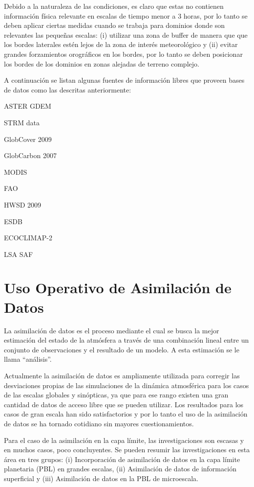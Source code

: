Debido a la naturaleza de las condiciones, es claro que estas no contienen información física relevante en escalas de tiempo menor a 3 horas, por lo tanto se deben aplicar ciertas medidas cuando se trabaja para dominios donde son relevantes las pequeñas escalas: (i) utilizar una zona de buffer de manera que que los bordes laterales estén lejos de la zona de interés meteorológico y (ii) evitar grandes forzamientos orográficos en los bordes, por lo tanto se deben posicionar los bordes de los dominios en zonas alejadas de terreno complejo. 

A continuación  se listan algunas fuentes de información libres que proveen bases de datos como las descritas anteriormente:
\begin{itemize*}
	\item ASTER GDEM
	\item STRM data
	\item GlobCover 2009
	\item GlobCarbon 2007
	\item MODIS
	\item FAO
	\item HWSD 2009
	\item ESDB
	\item ECOCLIMAP-2
	\item LSA SAF
\end{itemize*}
\newpage
\section{Uso Operativo de Asimilación de Datos}
La asimilación de datos es el proceso mediante el cual se busca la mejor  estimación del estado de la atmósfera a través de una combinación lineal entre un conjunto de observaciones y el resultado de un modelo. A esta estimación se le llama ``análisis''.

Actualmente la asimilación de datos es ampliamente utilizada para corregir las desviaciones propias de las simulaciones de la dinámica atmosférica para los casos de las escalas globales y sinópticas, ya que para ese rango existen una gran cantidad de datos de acceso libre que se pueden utilizar. Los resultados para los casos de gran escala han sido satisfactorios y por lo tanto el uso de la asimilación de datos se ha tornado cotidiano sin mayores cuestionamientos.

Para el caso de la asimilación en la capa límite, las investigaciones son escasas y en muchos casos, poco concluyentes. Se pueden resumir las investigaciones en esta área en tres grupos: (i) Incorporación de asimilación de datos en la capa límite planetaria (PBL) en grandes escalas, (ii) Asimilación de datos de información superficial y (iii) Asimilación de datos en la PBL de microescala. 

